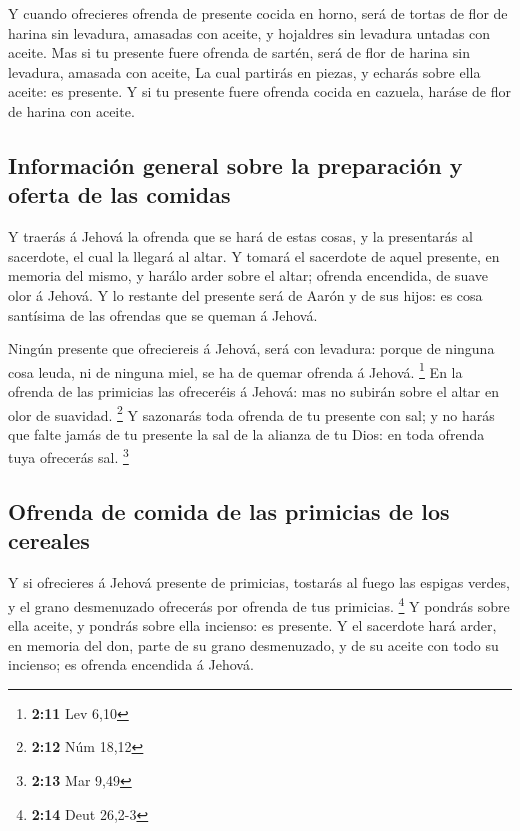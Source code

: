  Y cuando ofrecieres ofrenda de presente cocida en horno,
será de tortas de flor de harina sin levadura, amasadas con aceite, y
hojaldres sin levadura untadas con aceite.  Mas si tu
presente fuere ofrenda de sartén, será de flor de harina sin levadura,
amasada con aceite,  La cual partirás en piezas, y echarás
sobre ella aceite: es presente.  Y si tu presente fuere
ofrenda cocida en cazuela, haráse de flor de harina con aceite.

\hypertarget{informaciuxf3n-general-sobre-la-preparaciuxf3n-y-oferta-de-las-comidas}{%
\subsection{Información general sobre la preparación y oferta de las
comidas}\label{informaciuxf3n-general-sobre-la-preparaciuxf3n-y-oferta-de-las-comidas}}

 Y traerás á Jehová la ofrenda que se hará de estas cosas,
y la presentarás al sacerdote, el cual la llegará al altar.
 Y tomará el sacerdote de aquel presente, en memoria del
mismo, y harálo arder sobre el altar; ofrenda encendida, de suave olor á
Jehová.  Y lo restante del presente será de Aarón y de
sus hijos: es cosa santísima de las ofrendas que se queman á Jehová.

 Ningún presente que ofreciereis á Jehová, será con
levadura: porque de ninguna cosa leuda, ni de ninguna miel, se ha de
quemar ofrenda á Jehová. \footnote{\textbf{2:11} Lev 6,10}
 En la ofrenda de las primicias las ofreceréis á Jehová:
mas no subirán sobre el altar en olor de suavidad. \footnote{\textbf{2:12}
  Núm 18,12}  Y sazonarás toda ofrenda de tu presente con
sal; y no harás que falte jamás de tu presente la sal de la alianza de
tu Dios: en toda ofrenda tuya ofrecerás sal. \footnote{\textbf{2:13} Mar
  9,49}

\hypertarget{ofrenda-de-comida-de-las-primicias-de-los-cereales}{%
\subsection{Ofrenda de comida de las primicias de los
cereales}\label{ofrenda-de-comida-de-las-primicias-de-los-cereales}}

 Y si ofrecieres á Jehová presente de primicias, tostarás
al fuego las espigas verdes, y el grano desmenuzado ofrecerás por
ofrenda de tus primicias. \footnote{\textbf{2:14} Deut 26,2-3}
 Y pondrás sobre ella aceite, y pondrás sobre ella
incienso: es presente.  Y el sacerdote hará arder, en
memoria del don, parte de su grano desmenuzado, y de su aceite con todo
su incienso; es ofrenda encendida á Jehová.

